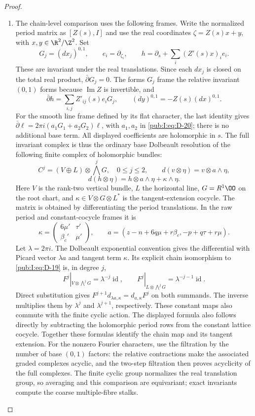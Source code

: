 \begin{proof}
\begin{enumerate}[label=\arabic*.,leftmargin=*]
\item The chain-level comparison uses the following frames. Write the normalized period matrix as $[Z(s),I]$
and use the real coordinates $\zeta=Z(s)x+y$, with
$x,y\in\R^2/\Z^2$. Set
\[
 G_j=(dx_j)^{0,1},\qquad e_i=\partial_{\zeta_i},\qquad
 h=\partial_s+\sum_i(Z'(s)x)_i e_i.
\]
These are invariant under the real translations. Since each $dx_j$
is closed on the total real product, $\bar\partial G_j=0$.
The forms $G_j$ frame the relative invariant $(0,1)$ forms because
$\operatorname{Im}Z$ is invertible, and
\[
 \bar\partial h=\sum_{i,j}Z'_{ij}(s)e_iG_j,
 \qquad (dy)^{0,1}=-Z(s)(dx)^{0,1}.
\]
For the smooth line frame defined by its flat character, the last
identity gives $\bar\partial\ell=2\pi i(a_1G_1+a_2G_2)\ell$,
with $a_1,a_2$ in \eqref{pub:I:eq:D-20}; there is no additional base term.
All displayed coefficients are holomorphic in $s$. The full
invariant complex is thus the ordinary base Dolbeault resolution
of the following finite complex of holomorphic bundles:
\[
 C^j=(V\oplus L)\otimes\bigwedge^jG,\quad0\le j\le2,
 \qquad
 d(v\otimes\eta)=v\otimes a\wedge\eta,
\]
\begin{equation}
 d(h\otimes\eta)=h\otimes a\wedge\eta+\kappa\wedge\eta.
\label{pub:I:eq:D-19}
\end{equation}
Here $V$ is the rank-two vertical bundle, $L$ the horizontal line,
$G=R^1\OO$ on the root chart, and $\kappa\in V\otimes G\otimes L^*$
is the tangent-extension cocycle. The matrix is obtained
by differentiating the period translations. In the raw period and
constant-cocycle frames it is
\begin{equation}
 \kappa=\begin{pmatrix}6\mu'&\tau'\\\beta_c'&\mu'\end{pmatrix},
 \qquad
 a=(z-n+6q\mu+r\beta_c,-p+q\tau+r\mu).
\label{pub:I:eq:D-20}
\end{equation}
Let $\lambda=2\pi i$. The Dolbeault exponential convention gives
the differential with Picard vector $\lambda a$ and tangent term
$\kappa$. Its explicit chain isomorphism to \eqref{pub:I:eq:D-19} is, in degree $j$,
\[
 F^j|_{V\otimes\bigwedge^jG}=\lambda^{-j}\operatorname{id},
 \qquad
 F^j|_{L\otimes\bigwedge^jG}=\lambda^{-j-1}\operatorname{id}.
\]
Direct substitution gives $F^{j+1}d_{\lambda a,\kappa}
=d_{a,\kappa}F^j$ on both summands. The inverse multiplies them
by $\lambda^j$ and $\lambda^{j+1}$, respectively. These constant
maps also commute with the finite cyclic action. The displayed formula also follows directly by
subtracting the holomorphic period rows from the constant lattice
cocycle. Together these formulas identify the chain map and its tangent extension.
For the nonzero Fourier characters, use the filtration by the number
of base $(0,1)$ factors: the relative contractions make the associated
graded complexes acyclic, and the two-step filtration then proves
acyclicity of the full complexes. The finite cyclic group
normalizes the real translation group, so averaging and this
comparison are equivariant; exact invariants compute the coarse
multiple-fibre stalks.


\end{enumerate}
\end{proof}
